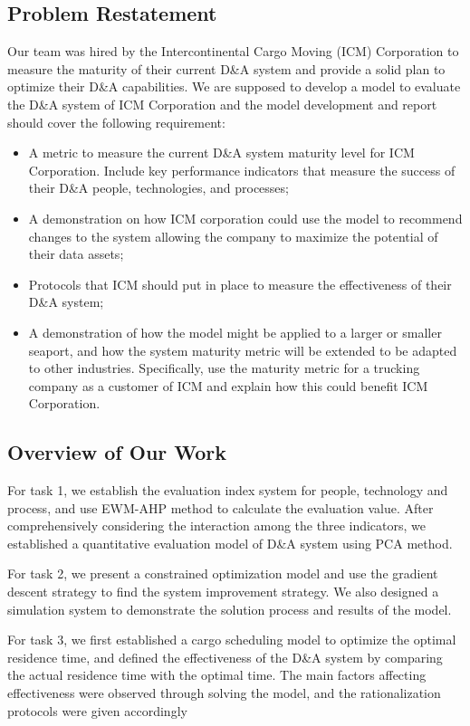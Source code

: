 \documentclass{mcmthesis}
\begin{document}
\subsection{Problem Restatement}
Our team was hired by the Intercontinental Cargo Moving (ICM) Corporation to measure the maturity of their current D\&A system and provide a solid plan to optimize their D\&A capabilities. We are supposed to develop a model to evaluate the D\&A system of ICM Corporation and the model development and report should cover the following requirement:
\begin{itemize}
    \item A metric to measure the current D\&A system maturity level for ICM Corporation. Include key performance indicators that measure the success of their D\&A people, technologies, and processes;
    \item A demonstration on how ICM corporation could use the model to recommend changes to the system allowing the company to maximize the potential of their data assets;
    \item Protocols that ICM should put in place to measure the effectiveness of their D\&A system;
    \item A demonstration of how the model might be applied to a larger or smaller seaport, and how the system maturity metric will be extended to be adapted to other industries. Specifically, use the maturity metric for a trucking company as a customer of ICM and explain how this could benefit ICM Corporation.
\end{itemize}

\subsection{Overview of Our Work}
For task 1, we establish the evaluation index system for people, technology and process, and use EWM-AHP method to calculate the evaluation value. After comprehensively considering the interaction among the three indicators, we established a quantitative evaluation model of D\&A system using PCA method.

For task 2, we present a constrained optimization model and use the gradient descent strategy to find the system improvement strategy. We also designed a simulation system to demonstrate the solution process and results of the model.

For task 3, we first established a cargo scheduling model to optimize the optimal residence time, and defined the effectiveness of the D\&A system by comparing the actual residence time with the optimal time. The main factors affecting effectiveness were observed through solving the model, and the rationalization protocols were given accordingly
\end{document}
